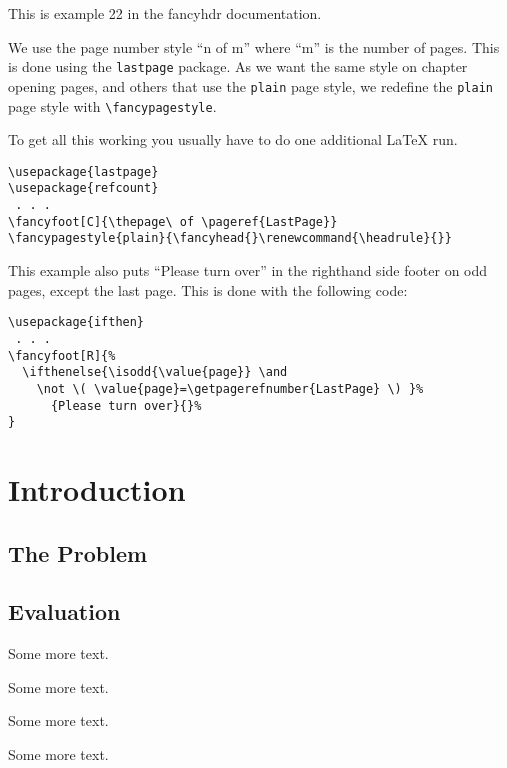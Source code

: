 \documentclass[openany]{book}
\begin{document}
\tableofcontents
\bigskip

\noindent
\begin{boxedminipage}{\textwidth}
This is example 22 in the fancyhdr documentation.

We use the page number style ``n of m'' where ``m'' is the number of pages. This is done using the \texttt{lastpage} package. As we want the same style on chapter opening pages, and others that use the \texttt{plain} page style, we redefine the \texttt{plain} page style with \verb|\fancypagestyle|.

To get all this working you usually have to do one additional \LaTeX{} run.

\begin{verbatim}
\usepackage{lastpage}
\usepackage{refcount}
 . . .
\fancyfoot[C]{\thepage\ of \pageref{LastPage}}
\fancypagestyle{plain}{\fancyhead{}\renewcommand{\headrule}{}}
\end{verbatim}

This example also puts  ``Please turn over'' in the righthand side footer on odd pages, except the last page. This is done with the following code:

\begin{verbatim}
\usepackage{ifthen}
 . . . 
\fancyfoot[R]{%
  \ifthenelse{\isodd{\value{page}} \and
    \not \( \value{page}=\getpagerefnumber{LastPage} \) }%
      {Please turn over}{}%
}
\end{verbatim}
\end{boxedminipage}

\chapter{Introduction}

\lipsum

\section{The Problem}
\label{sec:problem}

\lipsum[1]

\section{Evaluation}

\lipsum

Some more text.

Some more text.

Some more text.

Some more text.
\end{document}
